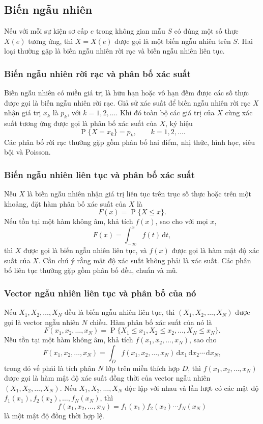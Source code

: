 \documentclass[11pt]{article}
\newcommand{\Prob}{\operatorname{P}}
\newcommand{\dd}{\,\mathrm{d}}
\begin{document}
\subsection{Biến ngẫu nhiên}

Nếu với mỗi sự kiện sơ cấp \(e\) trong không gian mẫu \(S\) có đúng một số thực
\(X(e)\) tương ứng, thì \(X=X(e)\) được gọi là một biến ngẫu nhiên trên
\(S\). Hai loại thường gặp là biến ngẫu nhiên rời rạc và biến ngẫu nhiên liên
tục.

\subsubsection{Biến ngẫu nhiên rời rạc và phân bố xác suất}

Biến ngẫu nhiên có miền giá trị là hữu hạn hoặc vô hạn đếm được các số thực
được gọi là biến ngẫu nhiên rời rạc. Giả sử xác suất để biến ngẫu nhiên rời
rạc \(X\) nhận giá trị \(x_k\) là \(p_k\), với \(k=1,2,\ldots\). Khi đó toàn bộ
các giá trị của \(X\) cùng xác suất tương ứng được gọi là phân bố xác suất của
\(X\), ký hiệu
\[
  \Prob\{X=x_k\}=p_k,\qquad k=1,2,\ldots.
\]
Các phân bố rời rạc thường gặp gồm phân bố hai điểm, nhị thức, hình học, siêu
bội và Poisson.

\subsubsection{Biến ngẫu nhiên liên tục và phân bố xác suất}

Nếu \(X\) là biến ngẫu nhiên nhận giá trị liên tục trên trục số thực hoặc trên
một khoảng, đặt hàm phân bố xác suất của \(X\) là
\[
  F(x)=\Prob\{X\le x\}.
\]
Nếu tồn tại một hàm không âm, khả tích \(f(x)\), sao cho với mọi \(x\),
\[
  F(x)=\int_{-\infty}^{x} f(t)\dd t,
\]
thì \(X\) được gọi là biến ngẫu nhiên liên tục, và \(f(x)\) được gọi là hàm
mật độ xác suất của \(X\). Cần chú ý rằng mật độ xác suất không phải là xác
suất. Các phân bố liên tục thường gặp gồm phân bố đều, chuẩn và mũ.

\subsubsection{Vector ngẫu nhiên liên tục và phân bố của nó}

Nếu \(X_1,X_2,\ldots,X_N\) đều là biến ngẫu nhiên liên tục, thì
\((X_1,X_2,\ldots,X_N)\) được gọi là vector ngẫu nhiên \(N\) chiều. Hàm phân bố
xác suất của nó là
\[
  F(x_1,x_2,\ldots,x_N)
  =\Prob\{X_1\le x_1,X_2\le x_2,\ldots,X_N\le x_N\}.
\]
Nếu tồn tại một hàm không âm, khả tích \(f(x_1,x_2,\ldots,x_N)\), sao cho
\[
  F(x_1,x_2,\ldots,x_N)
  =\int_D f(x_1,x_2,\ldots,x_N)\dd x_1\dd x_2\cdots\dd x_N,
\]
trong đó vế phải là tích phân \(N\) lớp trên miền thích hợp \(D\), thì
\(f(x_1,x_2,\ldots,x_N)\) được gọi là hàm mật độ xác suất đồng thời của vector
ngẫu nhiên \((X_1,X_2,\ldots,X_N)\). Nếu \(X_1,X_2,\ldots,X_N\) độc lập với
nhau và lần lượt có các mật độ \(f_1(x_1),f_2(x_2),\ldots,f_N(x_N)\), thì
\[
  f(x_1,x_2,\ldots,x_N)
  =f_1(x_1)f_2(x_2)\cdots f_N(x_N)
\]
là một mật độ đồng thời hợp lệ.
\end{document}
